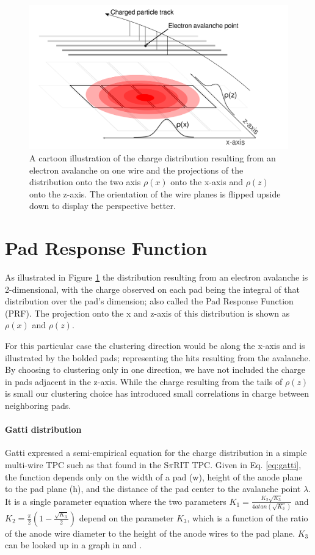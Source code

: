 \documentclass[review]{elsarticle}
\begin{document}
\begin{figure}[H]
\includegraphics[width=\linewidth]{padsat_Large}
\caption{A cartoon illustration of the charge distribution resulting from an electron avalanche on one wire and the projections of the distribution onto the two axis $\rho(x)$ onto the x-axis and $\rho(z)$ onto the z-axis. The orientation of the wire planes is flipped upside down to display the perspective better.}
\label{fig:prf}
\end{figure}

\section{Pad Response Function}
As illustrated in Figure \ref{fig:prf} the distribution resulting from an electron avalanche is 2-dimensional, with the charge observed on each pad being the integral of that distribution over the pad's dimension; also called the Pad Response Function (PRF). The projection onto the x and z-axis of this distribution is shown as $\rho(x)$ and $\rho(z)$. 

For this particular case the clustering direction would be along the x-axis and is illustrated by the bolded pads; representing the hits resulting from the avalanche. By choosing to clustering only in one direction, we have not included the charge in pads adjacent in the z-axis. While the charge resulting from the tails of $\rho(z)$ is small our clustering choice has introduced small correlations in charge between neighboring pads.

\paragraph{Gatti distribution}
Gatti \cite{gatti} expressed a semi-empirical equation for the charge distribution in a simple multi-wire TPC such as that found in the S$\pi$RIT TPC. Given in Eq. \ref{eq:gatti}, the function depends only on the width of a pad (w), height of the anode plane to the pad plane (h), and the distance of the pad center to the avalanche point $\lambda$. It is a single parameter equation where the two parameters $K_1 = \frac{K_{2}\sqrt{K_3}}{4 atan(\sqrt{K_3})}$ and $K_2 = \frac{\pi}{2}\left(1-\frac{\sqrt{K_{3}}}{2}\right)$ depend on the parameter $K_3$, which is a function of the ratio of the anode wire diameter to the height of the anode wires to the pad plane. $K_3$ can be looked up in a graph in \cite{blumrol} and \citep{gatti}.
\end{document}
